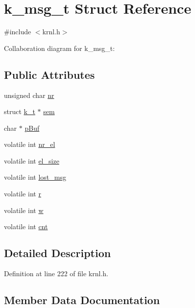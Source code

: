 \hypertarget{structk__msg__t}{}\section{k\+\_\+msg\+\_\+t Struct Reference}
\label{structk__msg__t}


{\ttfamily \#include $<$krnl.\+h$>$}



Collaboration diagram for k\+\_\+msg\+\_\+t\+:
\subsection*{Public Attributes}
\begin{DoxyCompactItemize}
\item 
unsigned char \hyperlink{structk__msg__t_a77ce5d05e251d771c3bbdc4ca724cbf7}{nr}
\item 
struct \hyperlink{structk__t}{k\+\_\+t} $\ast$ \hyperlink{structk__msg__t_abc38d50a3f77336df86ddc6a55665c0e}{sem}
\item 
char $\ast$ \hyperlink{structk__msg__t_ac1285a0d8e7c3925b8f7671d92553ef7}{p\+Buf}
\item 
volatile int \hyperlink{structk__msg__t_ae28a828860fdf0afcd9106045d223767}{nr\+\_\+el}
\item 
volatile int \hyperlink{structk__msg__t_a9e6cf0aaaa54e2c69938457b2a16e512}{el\+\_\+size}
\item 
volatile int \hyperlink{structk__msg__t_aea9315f70a4c165cf9bfaef79046c184}{lost\+\_\+msg}
\item 
volatile int \hyperlink{structk__msg__t_aac75863785b0f241b90e49b440f9cd4a}{r}
\item 
volatile int \hyperlink{structk__msg__t_ad7653be9d894a288d863062258a6c467}{w}
\item 
volatile int \hyperlink{structk__msg__t_afffaeebfdb8d84f296755babf6f296a6}{cnt}
\end{DoxyCompactItemize}


\subsection{Detailed Description}


Definition at line 222 of file krnl.\+h.



\subsection{Member Data Documentation}
\hypertarget{structk__msg__t_afffaeebfdb8d84f296755babf6f296a6}{}
